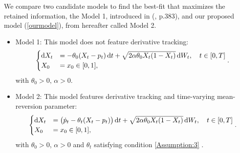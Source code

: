 \documentclass[11pt]{article}
\theoremstyle{definition}
\begin{document}
We compare two candidate models to find the best-fit that maximizes the retained information, {\color{black} the Model 1, introduced in (\cite{elkate}, p.383), and our proposed model  (\ref{ourmodel}), from hereafter called Model 2.}
\begin{itemize}
  \item Model 1: This model does not feature derivative tracking:
\begin{equation}
\begin{cases}
\dif X_t&=-\theta_0 (X_t - p_t) \dif t +\sqrt{2 \alpha \theta_0 X_t (1 - X_t)} \dif W_t, \quad t \in [0,T]  \\
X_0&=x_0\in [0,1],
\end{cases}.  \label{Model1}
\end{equation}
 with $\theta_0 > 0, \, \alpha > 0$.

%  

  \item Model 2: This model features derivative tracking and time-varying mean-reversion parameter:  
\begin{equation}
\begin{cases}
\dif X_t&= \big(\dot{p}_t  - \theta_t (X_t - p_t) \big) \dif t +\sqrt{2 \alpha \theta_0 X_t (1 - X_t)} \dif W_t, \quad t \in [0,T]\\
X_0&=x_0\in [0,1],
\end{cases}.  \label{Model2}
\end{equation}
 with $\theta_0 > 0$, $\alpha > 0$ and $\theta_t$ satisfying condition \eqref{Assumption:3} .
\end{itemize}
\end{document}
